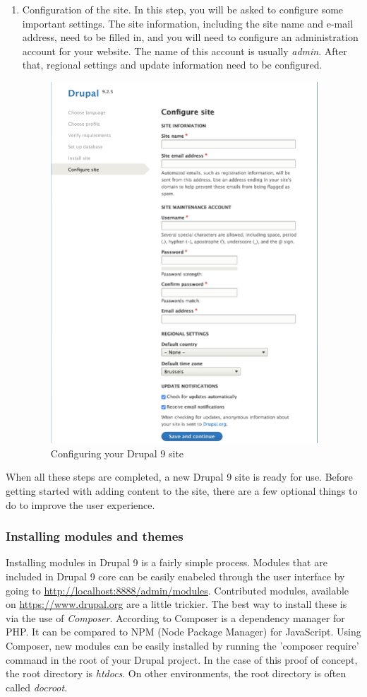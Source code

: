 \begin{enumerate}
	\item Configuration of the site. In this step, you will be asked to configure some important settings. The site information, including the site name and e-mail address, need to be filled in, and you will need to configure an administration account for your website. The name of this account is usually \emph{admin}. After that, regional settings and update information need to be configured.
	\begin{figure}
		\centering
		\includegraphics[width=10cm]{./img/Install_Config.png}
		\caption[Configuring Drupal 9]{Configuring your Drupal 9 site}
	\end{figure}
\end{enumerate}

When all these steps are completed, a new Drupal 9 site is ready for use. Before getting started with adding content to the site, there are a few optional things to do to improve the user experience.

\subsubsection{Installing modules and themes}

Installing modules in Drupal 9 is a fairly simple process. Modules that are included in Drupal 9 core can be easily enabeled through the user interface by going to \url{http://localhost:8888/admin/modules}. Contributed modules, available on \url{https://www.drupal.org} are a little trickier. The best way to install these is via the use of \emph{Composer}. According to \textcite{So2018} Composer is a dependency manager for PHP. It can be compared to NPM (Node Package Manager) for JavaScript. Using Composer, new modules can be easily installed by running the 'composer require' command in the root of your Drupal project. In the case of this proof of concept, the root directory is \emph{htdocs}. On other environments, the root directory is often called \emph{docroot}.

